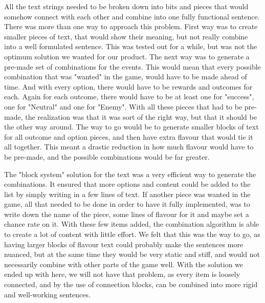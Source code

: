 All the text strings needed to be broken down into bits and pieces that would somehow connect with each other and combine into one fully functional sentence. 
There was more than one way to approach this problem.
First way was to create smaller pieces of text, that would show their meaning, but not really combine into a well formulated sentence. This was tested out for a while, but was not the optimum solution we wanted for our product.
The next way was to generate a pre-made set of combinations for the events. This would mean that every possible combination that was "wanted" in the game, would have to be made ahead of time. And with every option, there would have to be rewards and outcomes for each. Again for each outcome, there would have to be at least one for "success", one for "Neutral" and one for "Enemy". With all these pieces that had to be pre-made, the realization was that it was sort of the right way, but that it should be the other way around. The way to go would be to generate smaller blocks of text for all outcome and option pieces, and then have extra flavour that would tie it all together. This meant a drastic reduction in how much flavour would have to be pre-made, and the possible combinations would be far greater. 

The "block system" solution for the text was a very efficient way to generate the combinations. It ensured that more options and content could be added to the list by simply writing in a few lines of text. If another piece was wanted in the game, all that needed to be done in order to have it fully implemented, was to write down the name of the piece, some lines of flavour for it and maybe set a chance rate on it. With these few items added, the combination algorithm is able to create a lot of content with little effort. 
We felt that this was the way to go, as having larger blocks of flavour text could probably make the sentences more nuanced, but at the same time they would be very static and stiff, and would not necessarily combine with other parts of the game well. With the solution we ended up with here, we will not have that problem, as every item is loosely connected, and by the use of connection blocks, can be combined into more rigid and well-working sentences.



